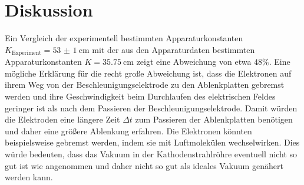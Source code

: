 \section{Diskussion}
\label{sec:Diskussion}
Ein Vergleich der experimentell bestimmten Apparaturkonstanten $K_\mathrm{Experiment}=\SI{53(1)}{\centi\meter}$ mit der aus den Apparaturdaten bestimmten Apparaturkonstanten $K=\SI{35.75}{\centi\meter}$ zeigt eine Abweichung von etwa $48\%$. Eine mögliche Erklärung für die recht große Abweichung ist, dass die Elektronen auf ihrem Weg von der Beschleunigungselektrode zu den Ablenkplatten gebremst werden und ihre Geschwindigkeit beim Durchlaufen des elektrischen Feldes geringer ist als nach dem Passieren der Beschleunigungselektrode. Damit würden die Elektroden eine längere Zeit $\Delta t$ zum Passieren der Ablenkplatten benötigen und daher eine größere Ablenkung erfahren.
Die Elektronen könnten beispielsweise gebremst werden, indem sie mit Luftmolekülen wechselwirken. Dies würde bedeuten, dass das Vakuum in der Kathodenstrahlröhre eventuell nicht so gut ist wie angenommen und daher nicht so gut als ideales Vakuum genähert werden kann.
